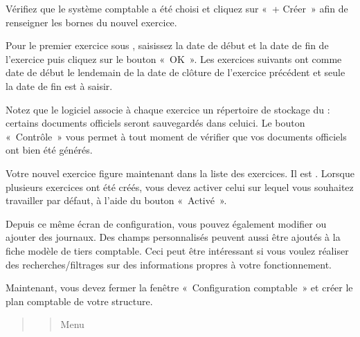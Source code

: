 \documentclass[a4paper,10pt,oneside,french]{sphinxmanual}
\begin{document}
\sphinxAtStartPar
Vérifiez que le système comptable a été choisi et cliquez sur « + Créer » afin de renseigner les bornes du nouvel exercice.
\begin{quote}

\noindent{}
\end{quote}

\sphinxAtStartPar
Pour le premier exercice sous , saisissez la date de début et la date de fin de l’exercice puis cliquez sur le bouton « OK ». Les exercices suivants ont comme date de début le lendemain de la date de clôture de l’exercice précédent et seule la date de fin est à saisir.

\sphinxAtStartPar
Notez que le logiciel associe à chaque exercice un répertoire de stockage du  : certains documents
officiels seront sauvegardés dans celui\sphinxhyphen{}ci. Le bouton « Contrôle » vous permet à tout moment de  vérifier que vos documents officiels ont bien été générés.

\sphinxAtStartPar
Votre nouvel exercice figure maintenant dans la liste des exercices. Il est \sphinxstylestrong{{[}en création{]}}. Lorsque plusieurs exercices ont été créés, vous devez activer celui sur lequel vous souhaitez travailler par défaut, à l’aide du bouton « Activé ».
\begin{quote}

\sphinxAtStartPar
{}
\end{quote}

\sphinxAtStartPar
Depuis ce même écran de configuration, vous pouvez également modifier ou ajouter des journaux. Des champs personnalisés peuvent aussi être ajoutés à la fiche modèle de tiers comptable. Ceci peut être intéressant si vous voulez réaliser des recherches/filtrages sur des informations propres à votre fonctionnement.

\sphinxAtStartPar
Maintenant, vous devez fermer la fenêtre « Configuration comptable » et créer le plan comptable de votre structure.
\begin{quote}
\begin{quote}

\sphinxAtStartPar
Menu 
\end{quote}
\end{quote}
\end{document}
